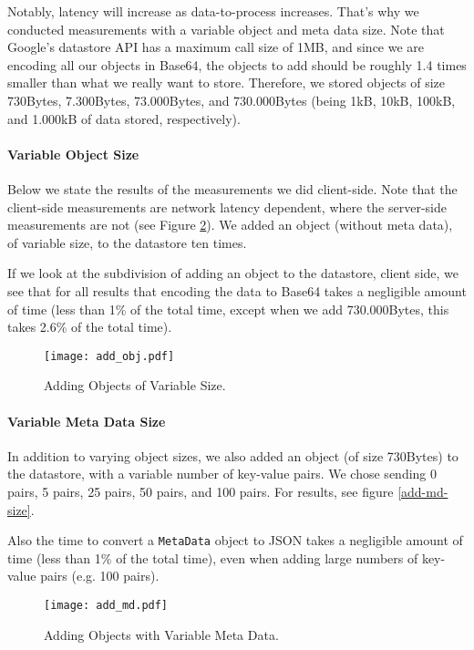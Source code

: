 Notably, latency will increase as data-to-process increases. That's why we
conducted measurements with a variable object and meta data size. Note that
Google's datastore API has a maximum call size of 1MB, and since we are
encoding all our objects in Base64, the objects to add should be roughly 1.4
times smaller than what we really want to store. Therefore, we stored objects 
of size 730Bytes, 7.300Bytes, 73.000Bytes, and 730.000Bytes (being 1kB, 10kB,
100kB, and 1.000kB of data stored, respectively).

\paragraph{Variable Object Size}
Below we state the results of the measurements we did client-side. Note that
the client-side measurements are network latency dependent, where the
server-side measurements are not (see Figure \ref{add-obj-size}). We added an
object (without meta data), of variable size, to the datastore ten times.

If we look at the subdivision of adding an object to the datastore, client
side, we see that for all results that encoding the data to Base64 takes a
negligible amount of time (less than 1\% of the total time, except when we add
730.000Bytes, this takes 2.6\% of the total time). 

\begin{figure}[ht] %
\begin{center}
\texttt{[image: add\_obj.pdf]}
\caption{Adding Objects of Variable Size. \label{add-obj-size}}
\end{center}
\end{figure}

\paragraph{Variable Meta Data Size}
In addition to varying object sizes, we also added an object (of size 730Bytes)
to the datastore, with a variable number of key-value pairs. We chose sending 0
pairs, 5 pairs, 25 pairs, 50 pairs, and 100 pairs. For results, see figure
\ref{add-md-size}.

Also the time to convert a \texttt{MetaData} object to JSON takes a negligible
amount of time (less than 1\% of the total time), even when adding large numbers
of key-value pairs (e.g. 100 pairs).

\begin{figure}[ht] %
\begin{center}
\texttt{[image: add\_md.pdf]}
\caption{Adding Objects with Variable Meta Data. \label{add-obj-size}}
\end{center}
\end{figure}

